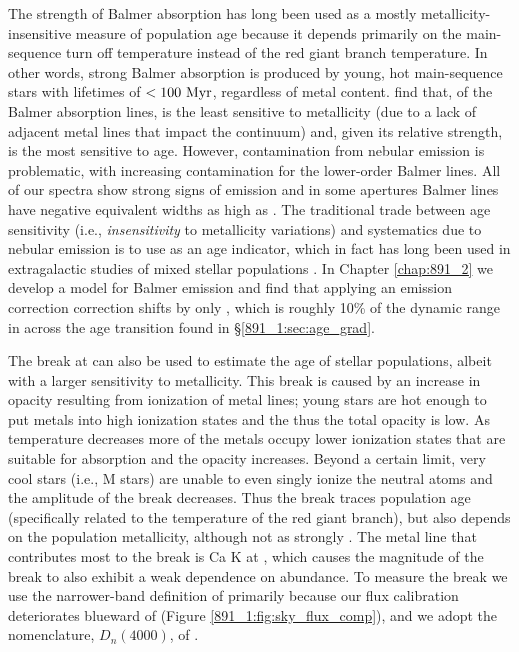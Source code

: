 The strength of Balmer absorption has long been used as a mostly
metallicity-insensitive measure of population age because it depends
primarily on the main-sequence turn off temperature instead of the red
giant branch temperature. In other words, strong Balmer absorption is
produced by young, hot main-sequence stars with lifetimes of
$<100~\mathrm{Myr} $, regardless of metal content. \citet{Worthey97} find
that, of the Balmer absorption lines, \HB is the least sensitive to
metallicity (due to a lack of adjacent metal lines that impact the
continuum) and, given its relative strength, is the most sensitive to
age.  However, contamination from nebular emission is problematic,
with increasing contamination for the lower-order Balmer lines.  All
of our spectra show strong signs of \Ha emission and in some apertures
Balmer lines have negative equivalent widths as high as \Hg.  The
traditional trade between age sensitivity (i.e., \emph{insensitivity}
to metallicity variations) and systematics due to nebular emission is
to use \Hda \citep{Worthey97} as an age indicator, which in fact has
long been used in extragalactic studies of mixed stellar populations
\citep[e.g.,][]{Couch87}. In Chapter \ref{chap:891_2} we develop a
model for Balmer emission and find that applying an emission
correction correction shifts \Hda by only ,
which is roughly 10\% of the dynamic range in \Hda across the age
transition found in \S\ref{891_1:sec:age_grad}.

The break at  can also be used to estimate the age of
stellar populations, albeit with a larger sensitivity to
metallicity. This break is caused by an increase in opacity resulting
from ionization of metal lines; young stars are hot enough to put
metals into high ionization states and the thus the total opacity is
low. As temperature decreases more of the metals occupy lower
ionization states that are suitable for absorption and the opacity
increases. Beyond a certain limit, very cool stars (i.e., M stars) are
unable to even singly ionize the neutral atoms and the amplitude of
the break decreases. Thus the  break traces population
age (specifically related to the temperature of the red giant branch),
but also depends on the population metallicity, although not as
strongly \citep[see][and Figure \ref{891_1:fig:D4000_cuts} here]{Bruzual83}.
The metal line that contributes most to the  break is
Ca K at , which causes the magnitude of the break to
also exhibit a weak dependence on abundance. To measure the
 break we use the narrower-band definition of
\citet{Balogh99} primarily because our flux calibration deteriorates
blueward of  (Figure \ref{891_1:fig:sky_flux_comp}), and we
adopt the nomenclature, $D_n(4000)$, of \citet{Kauffmann03}.

